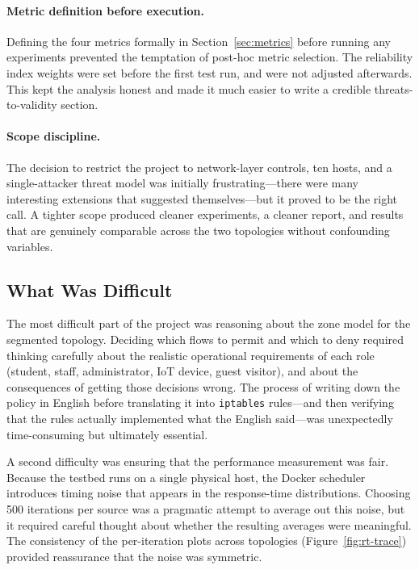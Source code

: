 \paragraph{Metric definition before execution.} Defining the four metrics formally in Section~\ref{sec:metrics} before running any experiments prevented the temptation of post-hoc metric selection. The reliability index weights were set before the first test run, and were not adjusted afterwards. This kept the analysis honest and made it much easier to write a credible threats-to-validity section.

\paragraph{Scope discipline.} The decision to restrict the project to network-layer controls, ten hosts, and a single-attacker threat model was initially frustrating---there were many interesting extensions that suggested themselves---but it proved to be the right call. A tighter scope produced cleaner experiments, a cleaner report, and results that are genuinely comparable across the two topologies without confounding variables.

\subsection{What Was Difficult}

The most difficult part of the project was reasoning about the zone model for the segmented topology. Deciding which flows to permit and which to deny required thinking carefully about the realistic operational requirements of each role (student, staff, administrator, IoT device, guest visitor), and about the consequences of getting those decisions wrong. The process of writing down the policy in English before translating it into \texttt{iptables} rules---and then verifying that the rules actually implemented what the English said---was unexpectedly time-consuming but ultimately essential.

A second difficulty was ensuring that the performance measurement was fair. Because the testbed runs on a single physical host, the Docker scheduler introduces timing noise that appears in the response-time distributions. Choosing 500 iterations per source was a pragmatic attempt to average out this noise, but it required careful thought about whether the resulting averages were meaningful. The consistency of the per-iteration plots across topologies (Figure~\ref{fig:rt-trace}) provided reassurance that the noise was symmetric.

